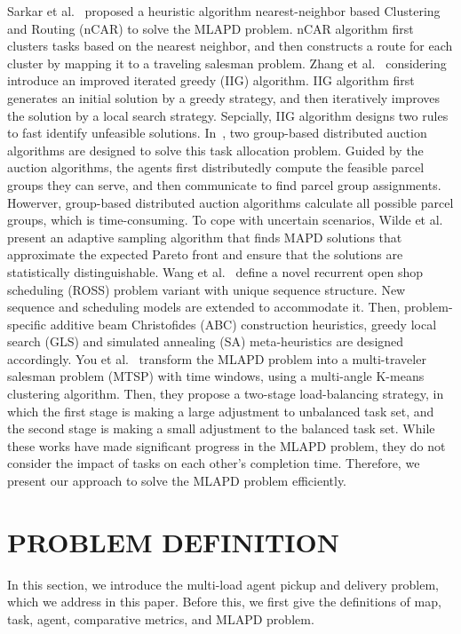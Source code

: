 \documentclass[sigconf,anonymous]{aamas}
\begin{document}
Sarkar et al.~\cite{sarkar2018scalable} proposed a heuristic algorithm
nearest-neighbor based Clustering and Routing (nCAR) to solve the MLAPD problem.
nCAR algorithm first clusters tasks based on the nearest neighbor,
and then constructs a route for each cluster by mapping it to a traveling salesman problem.
Zhang et al.~\cite{zhang2022effective} considering 
introduce an improved iterated greedy (IIG) algorithm.
IIG algorithm first generates an initial solution by a greedy strategy,
and then iteratively improves the solution by a local search strategy.
Sepcially, IIG algorithm designs two rules to fast identify unfeasible solutions.
In~\cite{bai2022group}, two group-based distributed auction algorithms are designed
to solve this task allocation problem. 
Guided by the auction algorithms,
the agents first distributedly compute the feasible parcel groups they can serve,
and then communicate to find parcel group assignments. 
Howerver, group-based distributed auction algorithms calculate all possible parcel groups,
which is time-consuming.
To cope with uncertain scenarios,
Wilde et al.~\cite{wilde2024statistically} present an adaptive sampling algorithm
that finds MAPD solutions that approximate the expected Pareto front
and ensure that the solutions are statistically distinguishable.
Wang et al.~\cite{wang2024task} define a novel recurrent open shop scheduling (ROSS) problem
variant with unique sequence structure.
New sequence and scheduling models are extended to accommodate it.
Then, problem-specific additive beam Christofides (ABC) construction heuristics,
greedy local search (GLS) and simulated annealing (SA) meta-heuristics 
are designed accordingly.
You et al.~\cite{electronics12183842} transform the MLAPD problem into
a multi-traveler salesman problem (MTSP) with time windows,
using a multi-angle K-means clustering algorithm.
Then, they propose a two-stage load-balancing strategy,
in which the first stage is making a large adjustment to unbalanced task set,
and the second stage is making a small adjustment to the balanced task set.
While these works have made significant progress in the MLAPD problem,
they do not consider the impact of tasks on each other's completion time.
Therefore, we present our approach to solve the MLAPD problem efficiently.

\section{PROBLEM DEFINITION}
\label{sec:problem}
In this section, we introduce the multi-load agent pickup and delivery problem, 
which we address in this paper. 
Before this, we first give the definitions of map, task, agent, comparative metrics, and MLAPD problem.
\end{document}
